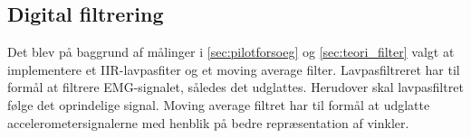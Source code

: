 \subsection{Digital filtrering}
Det blev på baggrund af målinger i \autoref{sec:pilotforsoeg} og \autoref{sec:teori_filter} valgt at implementere et IIR-lavpasfiter og et moving average filter. 
Lavpasfiltreret har til formål at filtrere EMG-signalet, således det udglattes. Herudover skal lavpasfiltret følge det oprindelige signal. Moving average filtret har til formål at udglatte accelerometersignalerne med henblik på bedre repræsentation af vinkler. 